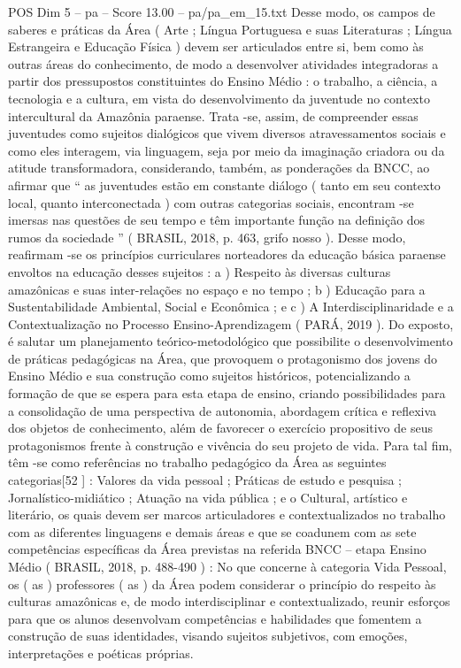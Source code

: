 \begin{textsample}{POS Dim 5 – pa – Score 13.00 – pa/pa\_em\_15.txt}
Desse modo, os campos de saberes e práticas da Área ( Arte ; Língua Portuguesa e suas Literaturas ; Língua Estrangeira e Educação Física ) devem ser articulados entre si, bem como às outras áreas do conhecimento, de modo a desenvolver atividades integradoras a partir dos pressupostos constituintes do Ensino Médio : o trabalho, a ciência, a tecnologia e a cultura, em vista do desenvolvimento da juventude no contexto intercultural da Amazônia paraense.
Trata -se, assim, de compreender essas juventudes como sujeitos dialógicos que vivem diversos atravessamentos sociais e como eles interagem, via linguagem, seja por meio da imaginação criadora ou da atitude transformadora, considerando, também, as ponderações da BNCC, ao afirmar que “ as juventudes estão em constante diálogo ( tanto em seu contexto local, quanto interconectada ) com outras categorias sociais, encontram -se imersas nas questões de seu tempo e têm importante função na definição dos rumos da sociedade ” ( BRASIL, 2018, p. 463, grifo nosso ).
Desse modo, reafirmam -se os princípios curriculares norteadores da educação básica paraense envoltos na educação desses sujeitos : a ) Respeito às diversas culturas amazônicas e suas inter-relações no espaço e no tempo ; b ) Educação para a Sustentabilidade Ambiental, Social e Econômica ; e c ) A Interdisciplinaridade e a Contextualização no Processo Ensino-Aprendizagem ( PARÁ, 2019 ).
Do exposto, é salutar um planejamento teórico-metodológico que possibilite o desenvolvimento de práticas pedagógicas na Área, que provoquem o protagonismo dos jovens do Ensino Médio e sua construção como sujeitos históricos, potencializando a formação de que se espera para esta etapa de ensino, criando possibilidades para a consolidação de uma perspectiva de autonomia, abordagem crítica e reflexiva dos objetos de conhecimento, além de favorecer o exercício propositivo de seus protagonismos frente à construção e vivência do seu projeto de vida.
Para tal fim, têm -se como referências no trabalho pedagógico da Área as seguintes categorias[52 ] : Valores da vida pessoal ; Práticas de estudo e pesquisa ; Jornalístico-midiático ; Atuação na vida pública ; e o Cultural, artístico e literário, os quais devem ser marcos articuladores e contextualizados no trabalho com as diferentes linguagens e demais áreas e que se coadunem com as sete competências específicas da Área previstas na referida BNCC – etapa Ensino Médio ( BRASIL, 2018, p. 488-490 ) : No que concerne à categoria Vida Pessoal, os ( as ) professores ( as ) da Área podem considerar o princípio do respeito às culturas amazônicas e, de modo interdisciplinar e contextualizado, reunir esforços para que os alunos desenvolvam competências e habilidades que fomentem a construção de suas identidades, visando sujeitos subjetivos, com emoções, interpretações e poéticas próprias.

\end{textsample}
